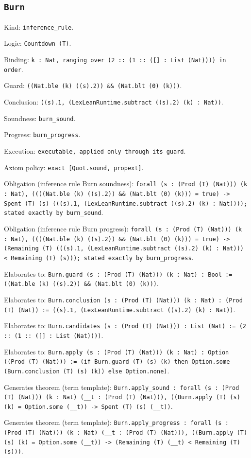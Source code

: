 \documentclass[11pt]{article}
\begin{document}
\subsection*{\texttt{Burn}}
\noindent Kind: \texttt{inference_rule}.\par
\noindent Logic: \texttt{Countdown (T)}.\par
\noindent Binding: \texttt{k : Nat, ranging over (2 :: (1 :: ([] : List (Nat)))) in order}.\par
\noindent Guard: \texttt{((Nat.ble (k) ((s).2)) \&\& (Nat.blt (0) (k)))}.\par
\noindent Conclusion: \texttt{((s).1, (LexLeanRuntime.subtract ((s).2) (k) : Nat))}.\par
\noindent Soundness: \texttt{burn\_sound}.\par
\noindent Progress: \texttt{burn\_progress}.\par
\noindent Execution: \texttt{executable, applied only through its guard}.\par
\noindent Axiom policy: \texttt{exact [Quot.sound, propext]}.\par
\noindent Obligation (inference rule Burn soundness): \texttt{forall (s : (Prod (T) (Nat))) (k : Nat), ((((Nat.ble (k) ((s).2)) \&\& (Nat.blt (0) (k))) = true) -> Spent (T) (s) (((s).1, (LexLeanRuntime.subtract ((s).2) (k) : Nat)))); stated exactly by burn\_sound}.\par
\noindent Obligation (inference rule Burn progress): \texttt{forall (s : (Prod (T) (Nat))) (k : Nat), ((((Nat.ble (k) ((s).2)) \&\& (Nat.blt (0) (k))) = true) -> (Remaining (T) (((s).1, (LexLeanRuntime.subtract ((s).2) (k) : Nat))) < Remaining (T) (s))); stated exactly by burn\_progress}.\par
\noindent Elaborates to: \texttt{Burn.guard (s : (Prod (T) (Nat))) (k : Nat) : Bool := ((Nat.ble (k) ((s).2)) \&\& (Nat.blt (0) (k)))}.\par
\noindent Elaborates to: \texttt{Burn.conclusion (s : (Prod (T) (Nat))) (k : Nat) : (Prod (T) (Nat)) := ((s).1, (LexLeanRuntime.subtract ((s).2) (k) : Nat))}.\par
\noindent Elaborates to: \texttt{Burn.candidates (s : (Prod (T) (Nat))) : List (Nat) := (2 :: (1 :: ([] : List (Nat))))}.\par
\noindent Elaborates to: \texttt{Burn.apply (s : (Prod (T) (Nat))) (k : Nat) : Option ((Prod (T) (Nat))) := (if Burn.guard (T) (s) (k) then Option.some (Burn.conclusion (T) (s) (k)) else Option.none)}.\par
\noindent Generates theorem (term template): \texttt{Burn.apply\_sound : forall (s : (Prod (T) (Nat))) (k : Nat) (\_\_t : (Prod (T) (Nat))), ((Burn.apply (T) (s) (k) = Option.some (\_\_t)) -> Spent (T) (s) (\_\_t))}.\par
\noindent Generates theorem (term template): \texttt{Burn.apply\_progress : forall (s : (Prod (T) (Nat))) (k : Nat) (\_\_t : (Prod (T) (Nat))), ((Burn.apply (T) (s) (k) = Option.some (\_\_t)) -> (Remaining (T) (\_\_t) < Remaining (T) (s)))}.\par
\end{document}
